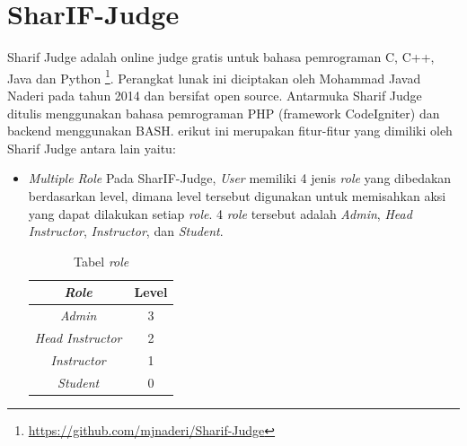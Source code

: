 \section{SharIF-Judge}
\label{sec: SharIF-Judge}
Sharif Judge adalah online judge gratis untuk bahasa pemrograman C, C++, Java dan Python \footnote{\url{https://github.com/mjnaderi/Sharif-Judge}}. Perangkat lunak ini diciptakan oleh Mohammad Javad Naderi pada tahun 2014 dan bersifat open source. Antarmuka Sharif Judge ditulis menggunakan bahasa pemrograman PHP (framework CodeIgniter) dan backend menggunakan BASH.
erikut ini merupakan fitur-fitur yang dimiliki oleh Sharif Judge antara lain yaitu:
\begin{itemize}
    \item {\textit{Multiple Role}}\newline
        Pada SharIF-Judge, \textit{User} memiliki 4 jenis \textit{role} yang dibedakan berdasarkan level, dimana level tersebut digunakan untuk memisahkan aksi yang dapat dilakukan setiap \textit{role}. 4 \textit{role} tersebut adalah \textit{Admin}, \textit{Head Instructor}, \textit{Instructor}, dan \textit{Student}. 
        
    \begin{table}[H] %
	    \centering 
	    \caption{Tabel \textit{role}}
	    \label{tab:level}
	    \begin{tabular}{|c|c|}
		    \hline
		    \textit{Role} & Level \\
		    \hline
		    \textit{Admin} & 3 \\
		    \hline
		    \textit{Head Instructor} & 2 \\
		    \hline
		    \textit{Instructor} & 1 \\
		    \hline
		    \textit{Student} & 0 \\
		    \hline
	    \end{tabular} 
    \end{table}
    

\end{itemize}
